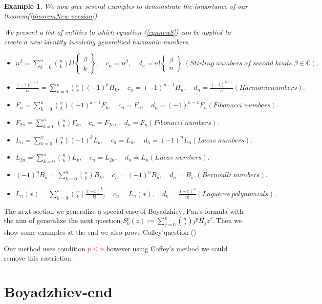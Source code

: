 \documentclass[a4paper,10pt,oneside]{article}
\newcommand{\BBC}{{\mathbb C}}
\newcommand{\col}[2]{ \textcolor{#1}{#2}}
\newtheorem{example}{Example}[section]
\newcommand{\st}[2]{\mbox{$\left\{\begin{array}{c}{#1}\\{#2} \end{array}\right\}$}}
\theoremstyle{definition}
\theoremstyle{remark}
\begin{document}
 \begin{example}\label{examplersp}
  We now give  several examples to demonstrate the importance of our theorem(\ref{theoremNew version})\par
 We present a list of entities to which equation  (\ref{eqnnew8}) can be applied to create a new identity involving generalized harmonic numbers.
\begin{itemize}
\item $n^{\beta}=\sum_{k=0}^n\binom{n}{k}k!\st{\beta}{k}, \quad c_n=n^{\beta},\quad d_n=n!\st{\beta}{n}.(Stirling\; numbers\; of\; second\; kinds\;\beta\in\BBC).$
\item $\frac{(-1)^{n-1}}{n}=\sum_{k=0}^n\binom{n}{k}(-1)^{k}H_k ,\quad c_n=(-1)^{n-1}H_n,\quad d_n=\frac{(-1)^{n-1}}{n}(Harmonic numbers). $
\item $F_n=\sum_{k=0}^n\binom{n}{k}(-1)^{k-1}F_k, \quad c_n=F_n,\quad d_n=(-1)^{n-1}F_n(Fibonacci \;numbers).$
\item $F_{2n}=\sum_{k=0}^n\binom{n}{k}F_k, \quad c_n=F_{2n},\quad d_n=F_n(Fibonacci \;numbers). $
\item $L_n=\sum_{k=0}^n\binom{n}{k}(-1)^{k}L_k, \quad c_n=L_n,\quad d_n=(-1)^{n}L_n(Lucas \;numbers).$
\item $L_{2n}=\sum_{k=0}^n\binom{n}{k}L_k, \quad c_n=L_{2n},\quad d_n=L_n(Lucas \;numbers). $
\item $(-1)^nB_{n}=\sum_{k=0}^n\binom{n}{k}B_k, \quad c_n=(-1)^nB_{n},\quad d_n=B_n.(Bernoulli \;numbers). $
\item $L_{n}(x)=\sum_{k=0}^n\binom{n}{k}\frac{(-x)^k}{k!}, \quad c_n=L_{n}(x),\quad d_n=\frac{(-x)^n}{n!} (Laguerre\, polynomials).$
\end{itemize}
\end{example}

\par
The next section  we generalize a special case of  Boyadzhiev, Pan's formula with the aim of generalize  the next question $S_n^p(z):=\sum_{j=0}^n\binom{n}{j}j^p H_jz^j.$ Then we show some examples at the end we also  prove Coffey'question   (\cite{coffey})   

Our method uses  condition \col{red}{ $p\leq n$} however using Coffey's method we could remove this restriction.\par 

 {\section{ Boyadzhiev-end}}
 
\end{document}
